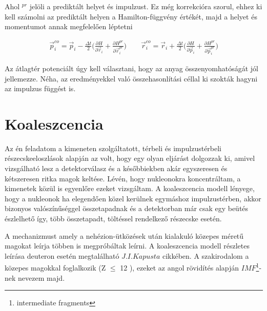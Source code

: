 \documentclass[a4paper,12pt]{article}
\begin{document}
\par Ahol $^{pr}$ jelöli a prediktált helyet és impulzust. Ez még korrekcióra szorul, ehhez ki kell számolni az prediktált helyen a Hamilton-függvény értékét, majd a helyet és momentumot annak megfelelően léptetni

\vspace{5mm}

\begin{gather}
	\vec{p}^{co}_{i} = \vec{p}_{i} - \frac{\Delta t}{2} \Big(\frac{\partial H}{\partial \vec{r}_{i}} + \frac{\partial H^{pr}}{\partial \vec{r}_{i}^{pr}} \Big) \quad \quad \vec{r}^{co}_{i} = \vec{r}_{i} + \frac{\Delta t}{2} \Big( \frac{\partial H}{\partial \vec{p}_{i}} + \frac{\partial H^{pr}}{\partial \vec{p}_{i}^{pr}} \Big)
\end{gather}

\vspace{5mm}

\par Az átlagtér potenciált úgy kell választani, hogy az anyag összenyomhatóságát jól jellemezze. Néha, az eredményekkel való összehasonlítási céllal ki szokták hagyni az impulzus függést is.

\vspace{5mm}

\section{ Koaleszcencia}

\vspace{5mm}

\par Az én feladatom a kimeneten szolgáltatott, térbeli és impulzustérbeli részecskeeloszlások alapján az volt, hogy egy olyan eljárást dolgozzak ki, amivel vizsgálható lesz a detektorválasz és a későbbiekben akár egyszeresen és kétszeresen ritka magok keltése. Lévén, hogy nukleonokra koncentráltam, a kimenetek közül is egyenlőre ezeket vizsgáltam. A koaleszcencia \cite{koleszcenciaSato} modell lényege, hogy a nukleonok ha elegendően közel kerülnek egymáshoz impulzustérben, akkor bizonyos valószínűséggel összetapadnak és a detektorban már csak egy beütés észlelhető így, több összetapadt, töltéssel rendelkező részecske esetén.

\vspace{5mm}

\par A mechanizmust amely a nehézion-ütközések után kialakuló közepes méretű magokat leírja többen is megpróbáltak leírni. A koaleszcencia modell részletes leírása deuteron esetén megtalálható $J. I. Kapusta$ cikkében. A szakirodalom a közepes magokkal foglalkozik (Z $\leq$ 12 \cite{REISDORF1997493}), ezeket az angol rövidítés alapján $IMF$\footnote{intermediate fragments}-nek nevezem majd. 
\end{document}

